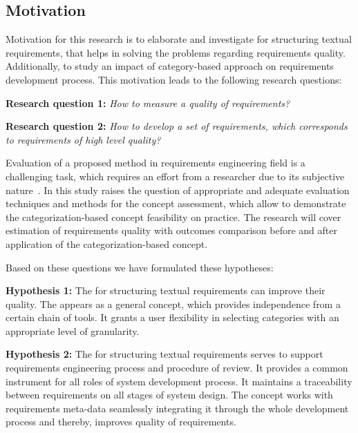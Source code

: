 \subsection{Motivation}
\label{sec:Motivation} 
Motivation for this research is to elaborate and investigate \cbc for
structuring textual requirements, that helps in solving the problems regarding
requirements quality. Additionally, to study an impact of category-based
approach on requirements development process. This motivation leads to the
following research questions:

\textbf{Research question 1:} \textit{How to measure a quality of requirements?}

\textbf{Research question 2:} \textit{How to develop a set of requirements, which corresponds to requirements of high level quality?}

Evaluation of a proposed method in requirements engineering field is a
challenging task, which requires an effort from a researcher due to its
subjective nature~\cite{16NaPiRe}. In this study raises the question of
appropriate and adequate evaluation techniques and methods for the concept
assessment, which allow to demonstrate the categorization-based concept
feasibility on practice. The research will cover estimation of requirements
quality with outcomes comparison before and after application of the
categorization-based concept.

Based on these questions we have formulated these hypotheses:

\textbf{Hypothesis 1:} The \cbc for structuring textual requirements can improve
their quality. The \cc appears as a general concept, which provides independence
from a certain chain of tools. It grants a user flexibility in selecting
categories with an appropriate level of granularity.

\textbf{Hypothesis 2:} The \cbc for structuring textual requirements serves to
support requirements engineering process and procedure of review. It provides a
common instrument for all roles of system development process. It maintains a
traceability between requirements on all stages of system design. The concept
works with requirements meta-data seamlessly integrating it through the whole
development process and thereby, improves quality of requirements.

